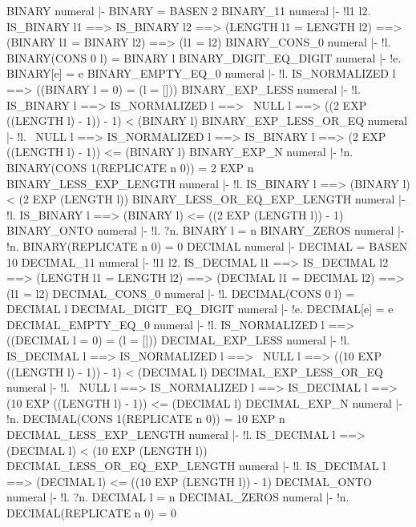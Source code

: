 \ENDTHEOREM
\THEOREM BINARY numeral
|- BINARY = BASEN 2
\ENDTHEOREM
\THEOREM BINARY\_11 numeral
|- !l1 l2.
    IS_BINARY l1 ==>
    IS_BINARY l2 ==>
    (LENGTH l1 = LENGTH l2) ==>
    (BINARY l1 = BINARY l2) ==>
    (l1 = l2)
\ENDTHEOREM
\THEOREM BINARY\_CONS\_0 numeral
|- !l. BINARY(CONS 0 l) = BINARY l
\ENDTHEOREM
\THEOREM BINARY\_DIGIT\_EQ\_DIGIT numeral
|- !e. BINARY[e] = e
\ENDTHEOREM
\THEOREM BINARY\_EMPTY\_EQ\_0 numeral
|- !l. IS_NORMALIZED l ==> ((BINARY l = 0) = (l = []))
\ENDTHEOREM
\THEOREM BINARY\_EXP\_LESS numeral
|- !l.
    IS_BINARY l ==>
    IS_NORMALIZED l ==>
    ~NULL l ==>
    ((2 EXP ((LENGTH l) - 1)) - 1) < (BINARY l)
\ENDTHEOREM
\THEOREM BINARY\_EXP\_LESS\_OR\_EQ numeral
|- !l.
    ~NULL l ==>
    IS_NORMALIZED l ==>
    IS_BINARY l ==>
    (2 EXP ((LENGTH l) - 1)) <= (BINARY l)
\ENDTHEOREM
\THEOREM BINARY\_EXP\_N numeral
|- !n. BINARY(CONS 1(REPLICATE n 0)) = 2 EXP n
\ENDTHEOREM
\THEOREM BINARY\_LESS\_EXP\_LENGTH numeral
|- !l. IS_BINARY l ==> (BINARY l) < (2 EXP (LENGTH l))
\ENDTHEOREM
\THEOREM BINARY\_LESS\_OR\_EQ\_EXP\_LENGTH numeral
|- !l. IS_BINARY l ==> (BINARY l) <= ((2 EXP (LENGTH l)) - 1)
\ENDTHEOREM
\THEOREM BINARY\_ONTO numeral
|- !l. ?n. BINARY l = n
\ENDTHEOREM
\THEOREM BINARY\_ZEROS numeral
|- !n. BINARY(REPLICATE n 0) = 0
\ENDTHEOREM
\THEOREM DECIMAL numeral
|- DECIMAL = BASEN 10
\ENDTHEOREM
\THEOREM DECIMAL\_11 numeral
|- !l1 l2.
    IS_DECIMAL l1 ==>
    IS_DECIMAL l2 ==>
    (LENGTH l1 = LENGTH l2) ==>
    (DECIMAL l1 = DECIMAL l2) ==>
    (l1 = l2)
\ENDTHEOREM
\THEOREM DECIMAL\_CONS\_0 numeral
|- !l. DECIMAL(CONS 0 l) = DECIMAL l
\ENDTHEOREM
\THEOREM DECIMAL\_DIGIT\_EQ\_DIGIT numeral
|- !e. DECIMAL[e] = e
\ENDTHEOREM
\THEOREM DECIMAL\_EMPTY\_EQ\_0 numeral
|- !l. IS_NORMALIZED l ==> ((DECIMAL l = 0) = (l = []))
\ENDTHEOREM
\THEOREM DECIMAL\_EXP\_LESS numeral
|- !l.
    IS_DECIMAL l ==>
    IS_NORMALIZED l ==>
    ~NULL l ==>
    ((10 EXP ((LENGTH l) - 1)) - 1) < (DECIMAL l)
\ENDTHEOREM
\THEOREM DECIMAL\_EXP\_LESS\_OR\_EQ numeral
|- !l.
    ~NULL l ==>
    IS_NORMALIZED l ==>
    IS_DECIMAL l ==>
    (10 EXP ((LENGTH l) - 1)) <= (DECIMAL l)
\ENDTHEOREM
\THEOREM DECIMAL\_EXP\_N numeral
|- !n. DECIMAL(CONS 1(REPLICATE n 0)) = 10 EXP n
\ENDTHEOREM
\THEOREM DECIMAL\_LESS\_EXP\_LENGTH numeral
|- !l. IS_DECIMAL l ==> (DECIMAL l) < (10 EXP (LENGTH l))
\ENDTHEOREM
\THEOREM DECIMAL\_LESS\_OR\_EQ\_EXP\_LENGTH numeral
|- !l. IS_DECIMAL l ==> (DECIMAL l) <= ((10 EXP (LENGTH l)) - 1)
\ENDTHEOREM
\THEOREM DECIMAL\_ONTO numeral
|- !l. ?n. DECIMAL l = n
\ENDTHEOREM
\THEOREM DECIMAL\_ZEROS numeral
|- !n. DECIMAL(REPLICATE n 0) = 0
